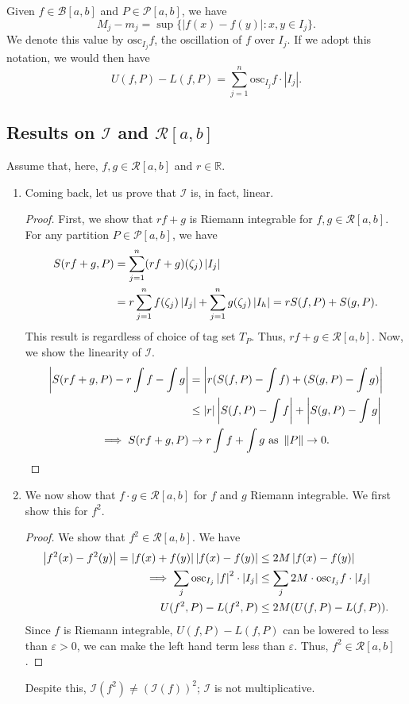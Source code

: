 \documentclass[15pt,a4paper]{book}
\theoremstyle{definition}
\newcommand{\abs}[1]{\left| #1 \right|} %
\newcommand{\R}{\mathbb{R}} %
\newcommand{\cP}{\mathcal{P}}
\newcommand{\cR}{\mathcal{R}}
\newcommand{\cB}{\mathcal{B}}
\newcommand{\cI}{\mathcal{I}}
\newcommand{\osc}{\text{osc}}
\newcommand{\norm}[1]{\left\lVert#1\right\rVert}
\begin{document}
Given $f \in \cB[a,b]$ and $P \in \cP[a,b]$, we have
\begin{equation}
    M_{j} - m_{j} = \sup\{\abs{f(x)-f(y)} : x,y \in I_{j}\}.
\end{equation}
We denote this value by $\osc_{I_{j}} f$, the oscillation of $f$ over $I_{j}$. If we adopt this notation, we would then have
\begin{equation}
    U(f,P) - L(f,P) = \sum_{j=1}^{n} \osc_{I_{j}} f \cdot \abs{I_{j}}.
\end{equation}
\subsection{Results on $\cI$ and $\cR[a,b]$}
Assume that, here, $f,g \in \cR[a,b]$ and $r \in \R$.
\begin{enumerate}
\item Coming back, let us prove that $\cI$ is, in fact, linear.
\begin{proof}
    First, we show that $rf+g$ is Riemann integrable for $f,g \in \cR[a,b]$. For any partition $P \in \cP[a,b]$, we have
    \begin{align}
        S(rf+g,P) &= \sum_{j=1}^{n} (rf+g)(\zeta_{j})\abs{I_{j}} \notag \\
        &= r \sum_{j=1}^{n} f(\zeta_{j})\abs{I_{j}} + \sum_{j=1}^{n} g(\zeta_{j}) \abs{I_{h}} = rS(f,P)+S(g,P).
    \end{align}
    This result is regardless of choice of tag set $T_{P}$. Thus, $rf+g \in \cR[a,b]$. Now, we show the linearity of $\cI$.
    \begin{align}
        \abs{S(rf+g,P) -r\int f - \int g} &= \abs{r(S(f,P)-\int f) + (S(g,P) - \int g)} \notag \\ &\leq \abs{r}\abs{S(f,P)-\int f} + \abs{S(g,P)- \int g} \\
        \implies S(rf+g,P) &\to r \int f + \int g \text{ as } \norm{P} \to 0.
    \end{align}
\end{proof}
\item We now show that $f \cdot g \in \cR[a,b]$ for $f$ and $g$ Riemann integrable. We first show this for $f^{2}$.
\begin{proof}
    We show that $f^{2} \in \cR[a,b]$. We have
    \begin{align}
        \abs{f^{2}(x)-f^{2}(y)} = \abs{f(x)+f(y)}\abs{f(x)-f(y)} &\leq 2M \abs{f(x)-f(y)} \notag \\
        \implies \sum_{j} \osc_{I_{j}} \abs{f}^{2} \cdot \abs{I_{j}} &\leq \sum_{j} 2M \cdot \osc_{I_{j}} f \cdot \abs{I_{j}} \notag \\
        U(f^{2},P)-L(f^{2},P) &\leq 2M(U(f,P)-L(f,P)).
    \end{align}
    Since $f$ is Riemann integrable, $U(f,P)-L(f,P)$ can be lowered to less than $\varepsilon > 0$, we can make the left hand term less than $\varepsilon$. Thus, $f^{2} \in \cR[a,b]$.
\end{proof}
Despite this, $\cI(f^{2}) \neq (\cI(f))^{2}$; $\cI$ is not multiplicative.


\end{enumerate}
\end{document}
